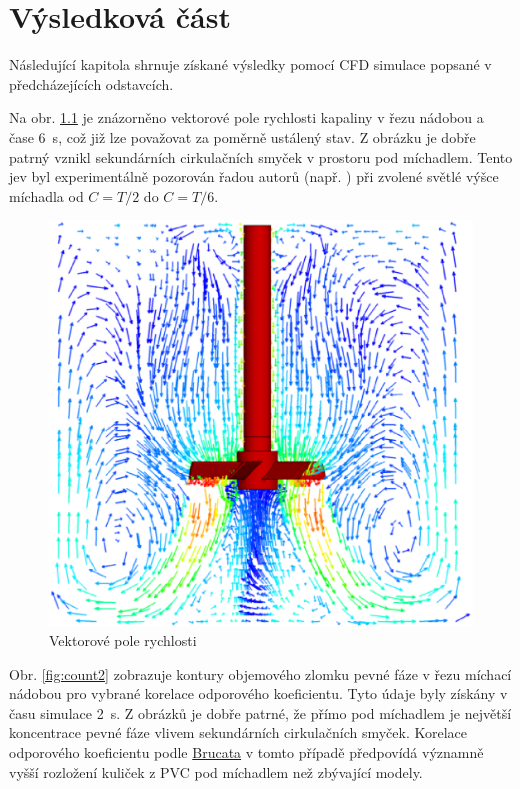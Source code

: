 \chapter{Výsledková část}
Následující kapitola shrnuje získané výsledky pomocí CFD simulace popsané v předcházejících odstavcích. 

Na obr. \ref{fig:vecfield} je znázorněno vektorové pole rychlosti kapaliny v řezu nádobou a čase \SI{6}{\second}, což již lze považovat za poměrně ustálený stav. Z obrázku je dobře patrný vznikl sekundárních cirkulačních smyček v prostoru pod míchadlem. Tento jev byl experimentálně pozorován řadou autorů (např. \citet{hos10}) při zvolené světlé výšce míchadla od $C=T/2$ do $C=T/6$.  

\begin{figure}[h!]
\begin{center}
\includegraphics[scale=0.5]{images/vecfield.eps}
\caption{Vektorové pole rychlosti}
\label{fig:vecfield}
\end{center}
\end{figure} 

\vspace{-9mm}

Obr. \ref{fig:count2} zobrazuje kontury objemového zlomku pevné fáze v řezu míchací nádobou pro vybrané korelace odporového koeficientu. Tyto údaje byly získány v času simulace \SI{2}{\second}. Z obrázků je dobře patrné, že přímo pod míchadlem je největší koncentrace pevné fáze vlivem sekundárních cirkulačních smyček. Korelace odporového koeficientu podle \hyperlink{hyp:cds}{Brucata} v tomto případě předpovídá významně vyšší rozložení kuliček z PVC pod míchadlem než zbývající modely.

